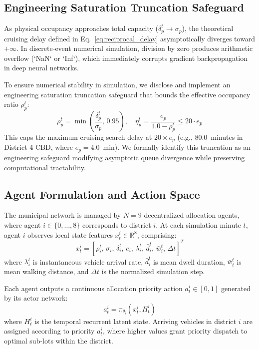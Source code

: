 \documentclass[journal]{IEEEtran}
\begin{document}
\subsection{Engineering Saturation Truncation Safeguard}
As physical occupancy approaches total capacity ($\delta_p^t \to \sigma_p$), the theoretical cruising delay defined in Eq.~\eqref{eq:reciprocal_delay} asymptotically diverges toward $+\infty$. In discrete-event numerical simulation, division by zero produces arithmetic overflow (`NaN` or `Inf`), which immediately corrupts gradient backpropagation in deep neural networks. 

To ensure numerical stability in simulation, we disclose and implement an engineering saturation truncation safeguard that bounds the effective occupancy ratio $\rho_p^t$:
\begin{equation}
\rho_p^t = \min\left(\frac{\delta_p^t}{\sigma_p}, \, 0.95\right), \quad \eta_p^t = \frac{e_p}{1.0 - \rho_p^t} \le 20 \cdot e_p
\label{eq:saturation_cap}
\end{equation}
This caps the maximum cruising search delay at $20 \times e_p$ (e.g., 80.0~minutes in District 4 CBD, where $e_p = 4.0$~min). We formally identify this truncation as an engineering safeguard modifying asymptotic queue divergence while preserving computational tractability.

\subsection{Agent Formulation and Action Space}
The municipal network is managed by $N=9$ decentralized allocation agents, where agent $i \in \{0, \dots, 8\}$ corresponds to district $i$. At each simulation minute $t$, agent $i$ observes local state features $x_t^i \in \mathbb{R}^8$, comprising:
\begin{equation}
x_t^i = \left[ \rho_i^t, \, \sigma_i, \, \delta_i^t, \, e_i, \, \lambda_i^t, \, \bar{d}_i^t, \, \bar{w}_i^t, \, \Delta t \right]^T
\end{equation}
where $\lambda_i^t$ is instantaneous vehicle arrival rate, $\bar{d}_i^t$ is mean dwell duration, $\bar{w}_i^t$ is mean walking distance, and $\Delta t$ is the normalized simulation step.

Each agent outputs a continuous allocation priority action $a_t^i \in [0, 1]$ generated by its actor network:
\begin{equation}
a_t^i = \pi_{\theta_i}(x_t^i, H_t^i)
\end{equation}
where $H_t^i$ is the temporal recurrent latent state. Arriving vehicles in district $i$ are assigned according to priority $a_t^i$, where higher values grant priority dispatch to optimal sub-lots within the district.
\end{document}
